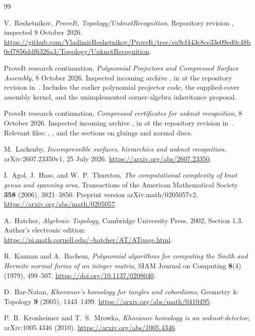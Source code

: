 \begin{thebibliography}{99}
\raggedright
{}
V.~Reshetnikov, \emph{ProveIt, Topology/UnknotRecognition}.
Repository revision \sourcepin, inspected 8 October 2026.
\url{https://github.com/VladimirReshetnikov/ProveIt/tree/ea9cf443c8ce33e09ed0c48b0ef7856ddf6326a3/Topology/UnknotRecognition}.

ProveIt research continuation, \emph{Polynomial Projectors and Compressed
Surface Assembly}, 8 October 2026. Inspected incoming archive
, in 
at the repository revision in~\cite{repo}. Includes the earlier
polynomial projector code, the supplied-cover assembly kernel, and the
unimplemented corner-algebra inheritance proposal.

ProveIt research continuation, \emph{Compressed certificates for unknot
recognition}, 8 October 2026. Inspected incoming archive
, in  at the
repository revision in~\cite{repo}. Relevant files:
, , and
the sections on gluings and normal discs.

M.~Lackenby, \emph{Incompressible surfaces, hierarchies and unknot
recognition}, arXiv:2607.23350v1, 25 July 2026.
\url{https://arxiv.org/abs/2607.23350}.

I.~Agol, J.~Hass, and W.~P.~Thurston,
\emph{The computational complexity of knot genus and spanning area},
Transactions of the American Mathematical Society \textbf{358} (2006),
3821--3850. Preprint version arXiv:math/0205057v2.
\url{https://arxiv.org/abs/math/0205057}.

A.~Hatcher, \emph{Algebraic Topology}, Cambridge University Press, 2002,
Section 1.3. Author's electronic edition:
\url{https://pi.math.cornell.edu/~hatcher/AT/ATpage.html}.

R.~Kannan and A.~Bachem,
\emph{Polynomial algorithms for computing the Smith and Hermite normal
forms of an integer matrix}, SIAM Journal on Computing \textbf{8}(4)
(1979), 499--507.
\url{https://doi.org/10.1137/0208040}.

D.~Bar-Natan, \emph{Khovanov's homology for tangles and cobordisms},
Geometry \& Topology \textbf{9} (2005), 1443--1499.
\url{https://arxiv.org/abs/math/0410495}.

P.~B.~Kronheimer and T.~S.~Mrowka,
\emph{Khovanov homology is an unknot-detector},
arXiv:1005.4346 (2010).
\url{https://arxiv.org/abs/1005.4346}.


\end{thebibliography}
